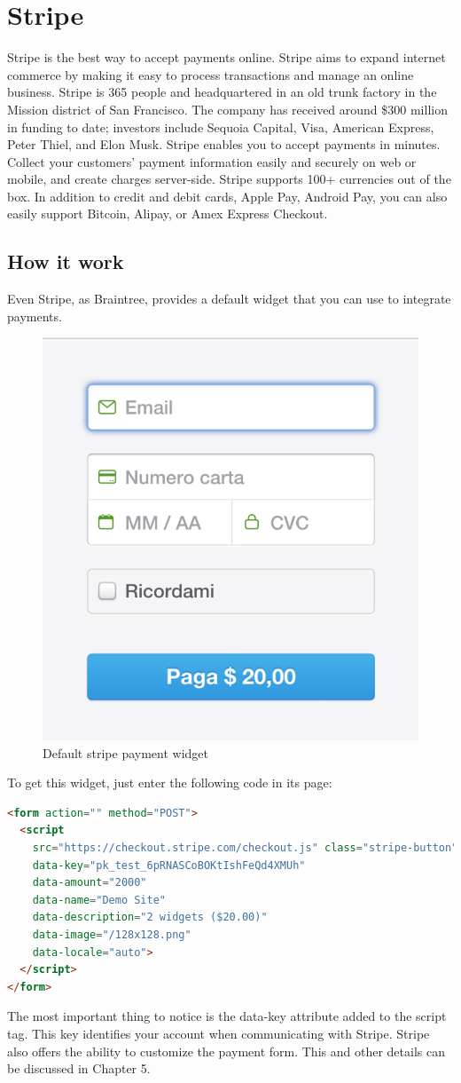 \section{Stripe}
\label{sec:stripe}
Stripe is the best way to accept payments online. Stripe aims to expand internet commerce by making it easy to process transactions and manage an online business.
\newline
Stripe is 365 people and headquartered in an old trunk factory in the Mission district of San Francisco. The company has received around \$300 million in funding to date; investors include Sequoia Capital, Visa, American Express, Peter Thiel, and Elon Musk. Stripe enables you to accept payments in minutes. Collect your customers’ payment information easily and securely on web or mobile, and create charges server-side. Stripe supports 100+ currencies out of the box. In addition to credit and debit cards, Apple Pay, Android Pay, you can also easily support Bitcoin, Alipay, or Amex Express Checkout.
\subsection{How it work}
Even Stripe, as Braintree, provides a default widget that you can use to integrate payments.
\begin{figure}[htb]
  \centering
  \includegraphics[width=0.5\linewidth]{images/chapter4/stripe-drop.png}\hfill
  \caption[Default stripe payment widget]{Default stripe payment widget}
\label{fig:stripe_default_ui}
\end{figure}
To get this widget, just enter the following code in its page:
\begin{lstlisting}[language=html]
<form action="" method="POST">
  <script
    src="https://checkout.stripe.com/checkout.js" class="stripe-button"
    data-key="pk_test_6pRNASCoBOKtIshFeQd4XMUh"
    data-amount="2000"
    data-name="Demo Site"
    data-description="2 widgets ($20.00)"
    data-image="/128x128.png"
    data-locale="auto">
  </script>
</form>
\end{lstlisting}
The most important thing to notice is the data-key attribute added to the script tag. This key identifies your account when communicating with Stripe.
\newline
Stripe also offers the ability to customize the payment form. This and other details can be discussed in Chapter 5.